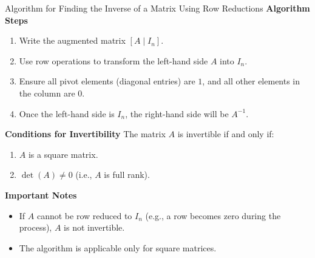 \documentclass[10pt, aspectratio=169]{beamer}
\begin{document}
\begin{frame}{Algorithm for Finding the Inverse of a Matrix Using Row Reductions}
\textbf{Algorithm Steps}
\begin{enumerate}
    \item Write the augmented matrix \([A \mid I_n]\).
    \item Use row operations to transform the left-hand side \(A\) into \(I_n\).
    \item Ensure all pivot elements (diagonal entries) are \(1\), and all other elements in the column are \(0\).
    \item Once the left-hand side is \(I_n\), the right-hand side will be \(A^{-1}\).
\end{enumerate}

\textbf{Conditions for Invertibility}
The matrix \(A\) is invertible if and only if:
\begin{enumerate}
    \item \(A\) is a square matrix.
    \item \(\det(A) \neq 0\) (i.e., \(A\) is full rank).
\end{enumerate}

\textbf{Important Notes}
\begin{itemize}
    \item If \(A\) cannot be row reduced to \(I_n\) (e.g., a row becomes zero during the process), \(A\) is not invertible.
    \item The algorithm is applicable only for square matrices.
\end{itemize}
\end{frame}
\end{document}
